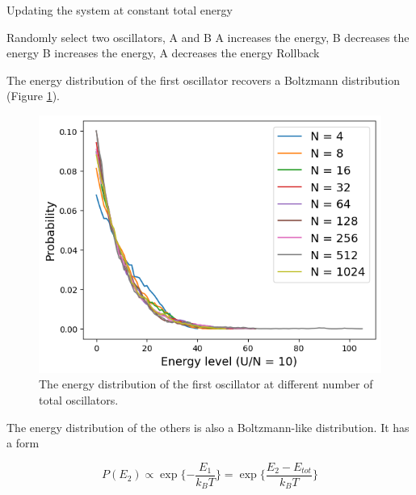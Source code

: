 \documentclass{assignmeownt}
\begin{document}


\begin{algorithm}
  \caption{Updating the system at constant total energy}
  \begin{algorithmic}
    \State Randomly select two oscillators, A and B
    \State A increases the energy, B decreases the energy
    \Else
    \State B increases the energy, A decreases the energy
    \EndIf
    \State Rollback
    \EndIf
  \end{algorithmic}
\end{algorithm}


The energy distribution of the first oscillator recovers a Boltzmann distribution (Figure \ref{fig:boltzmann_oscillator}).

\begin{figure}
  \centering
  \includegraphics[width=0.5\linewidth]{../block1/3-CoupledHarmonicOscillator/Results/1.png}
  \caption{The energy distribution of the first oscillator at different number of total oscillators.}
  \label{fig:boltzmann_oscillator}
\end{figure}

The energy distribution of the others is also a Boltzmann-like distribution. It has a form

$$P(E_2) \propto \exp\{-\frac{E_1}{k_BT}\}=\exp\{\frac{E_2-E_{tot}}{k_BT}\}$$
\end{document}
